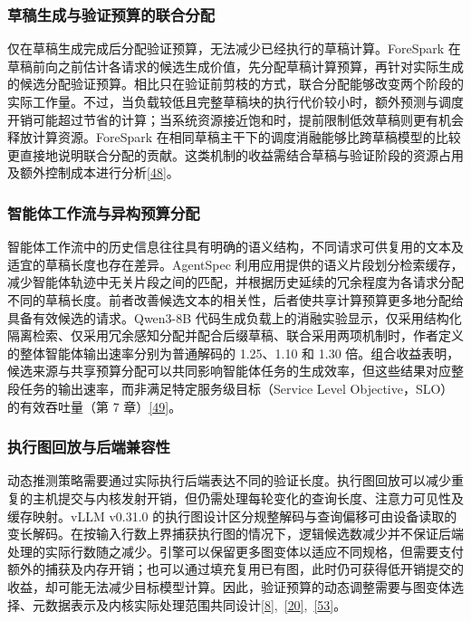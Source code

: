 \documentclass[11pt,a4paper,UTF8,fontset=none,scheme=plain,zihao=-4]{ctexart}
\begin{document}
\hypertarget{section-6-2-2}{%
\subsubsection{草稿生成与验证预算的联合分配}\label{section-6-2-2}}

仅在草稿生成完成后分配验证预算，无法减少已经执行的草稿计算。ForeSpark
在草稿前向之前估计各请求的候选生成价值，先分配草稿计算预算，再针对实际生成的候选分配验证预算。相比只在验证前剪枝的方式，联合分配能够改变两个阶段的实际工作量。不过，当负载较低且完整草稿块的执行代价较小时，额外预测与调度开销可能超过节省的计算；当系统资源接近饱和时，提前限制低效草稿则更有机会释放计算资源。ForeSpark
在相同草稿主干下的调度消融能够比跨草稿模型的比较更直接地说明联合分配的贡献。这类机制的收益需结合草稿与验证阶段的资源占用及额外控制成本进行分析\protect\hyperlink{ref-forespark}{{[}48{]}}。

\hypertarget{section-6-2-3}{%
\subsubsection{智能体工作流与异构预算分配}\label{section-6-2-3}}

智能体工作流中的历史信息往往具有明确的语义结构，不同请求可供复用的文本及适宜的草稿长度也存在差异。AgentSpec
利用应用提供的语义片段划分检索缓存，减少智能体轨迹中无关片段之间的匹配，并根据历史延续的冗余程度为各请求分配不同的草稿长度。前者改善候选文本的相关性，后者使共享计算预算更多地分配给具备有效候选的请求。Qwen3-8B
代码生成负载上的消融实验显示，仅采用结构化隔离检索、仅采用冗余感知分配并配合后缀草稿、联合采用两项机制时，作者定义的整体智能体输出速率分别为普通解码的
1.25、1.10 和 1.30
倍。组合收益表明，候选来源与共享预算分配可以共同影响智能体任务的生成效率，但这些结果对应整段任务的输出速率，而非满足特定服务级目标（Service
Level Objective，SLO）的有效吞吐量（第 7
章）\protect\hyperlink{ref-agentspec}{{[}49{]}}。

\hypertarget{section-6-2-4}{%
\subsubsection{执行图回放与后端兼容性}\label{section-6-2-4}}

动态推测策略需要通过实际执行后端表达不同的验证长度。执行图回放可以减少重复的主机提交与内核发射开销，但仍需处理每轮变化的查询长度、注意力可见性及缓存映射。vLLM
v0.31.0
的执行图设计区分规整解码与查询偏移可由设备读取的变长解码。在按输入行数上界捕获执行图的情况下，逻辑候选数减少并不保证后端处理的实际行数随之减少。引擎可以保留更多图变体以适应不同规格，但需要支付额外的捕获及内存开销；也可以通过填充复用已有图，此时仍可获得低开销提交的收益，却可能无法减少目标模型计算。因此，验证预算的动态调整需要与图变体选择、元数据表示及内核实际处理范围共同设计\protect\hyperlink{ref-evict}{{[}8{]}},~\protect\hyperlink{ref-vllmgraphdocs}{{[}20{]}},~\protect\hyperlink{ref-avdocs}{{[}53{]}}。
\end{document}
